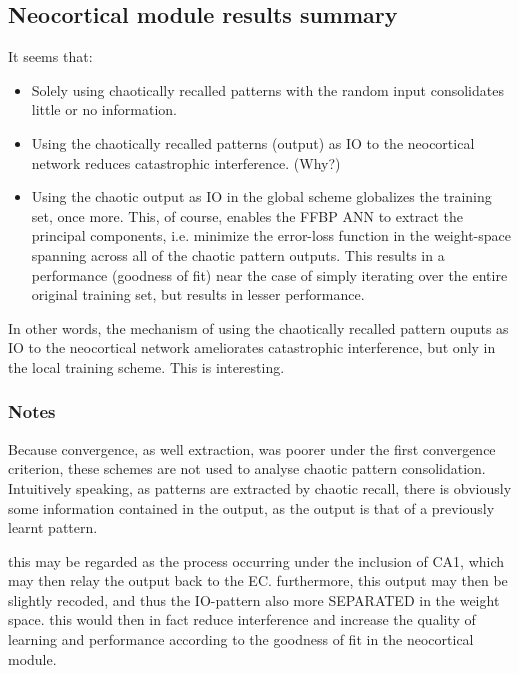 
\subsection{Neocortical module results summary}

It seems that:

\begin{itemize}
    \item Solely using chaotically recalled patterns with the random input consolidates little or no information.
    \item Using the chaotically recalled patterns (output) as IO to the neocortical network reduces catastrophic interference. (Why?)
    \item Using the chaotic output as IO in the global scheme globalizes the training set, once more. This, of course, enables the FFBP ANN to extract the principal components, i.e. minimize the error-loss function in the weight-space spanning across all of the chaotic pattern outputs. This results in a performance (goodness of fit) near the case of simply iterating over the entire original training set, but results in lesser performance.
\end{itemize}

In other words, the mechanism of using the chaotically recalled pattern ouputs as IO to the neocortical network ameliorates catastrophic interference, but only in the local training scheme. This is interesting.

\subsubsection{Notes}

Because convergence, as well extraction, was poorer under the first convergence criterion, these schemes are not used to analyse chaotic pattern consolidation.
Intuitively speaking, as patterns are extracted by chaotic recall, there is obviously some information contained in the output, as the output is that of a previously learnt pattern.

this may be regarded as the process occurring under the inclusion of CA1, which may then relay the output back to the EC. furthermore, this output may then be slightly recoded, and thus the IO-pattern also more SEPARATED in the weight space. this would then in fact reduce interference and increase the quality of learning and performance according to the goodness of fit in the neocortical module.


